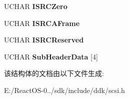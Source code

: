 \begin{DoxyCompactItemize}
U\+C\+H\+AR {\bfseries I\+S\+R\+C\+Zero}
\item 
\mbox{\label{struct___m_o_d_e___c_d_r_o_m___w_r_i_t_e___p_a_r_a_m_e_t_e_r_s___p_a_g_e_a2fe010d29a337fa38e3ccac4e9393029}} 
U\+C\+H\+AR {\bfseries I\+S\+R\+C\+A\+Frame}
\item 
\mbox{\label{struct___m_o_d_e___c_d_r_o_m___w_r_i_t_e___p_a_r_a_m_e_t_e_r_s___p_a_g_e_a938814e1c326b272a3f0b515601c4a4b}} 
U\+C\+H\+AR {\bfseries I\+S\+R\+C\+Reserved}
\item 
\mbox{\label{struct___m_o_d_e___c_d_r_o_m___w_r_i_t_e___p_a_r_a_m_e_t_e_r_s___p_a_g_e_aff42331aead4faa9ec12dc6badb89054}} 
U\+C\+H\+AR {\bfseries Sub\+Header\+Data} \mbox{[}4\mbox{]}
\end{DoxyCompactItemize}


该结构体的文档由以下文件生成\+:\begin{DoxyCompactItemize}
\item 
E\+:/\+React\+O\+S-\/0../sdk/include/ddk/scsi.\+h\end{DoxyCompactItemize}
